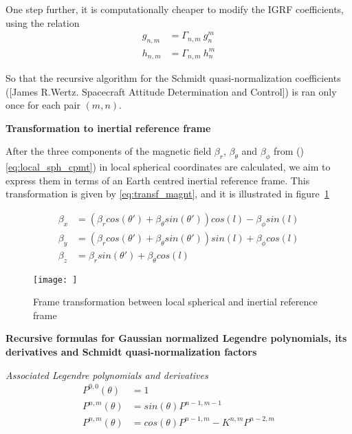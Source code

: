 One step further, it is computationally cheaper to modify the IGRF coefficients, using the relation
\begin{equation}
\begin{aligned}
g_{n,m} &= \Gamma_{n,m}\ g_n^m \\ h_{n,m} &= \Gamma_{n,m}\  h_n^m
\end{aligned}
\end{equation}

So that the recursive algorithm for the Schmidt quasi-normalization coefficients ([James R.Wertz. Spacecraft Attitude Determination and Control]) is ran only once for each pair $(m,n)$.

\textbf{Transformation to inertial reference frame}

After the three components of the magnetic field $\beta_r$, $\beta_{\theta}$ and $\beta_{\phi}$ from ()\ref{eq:local_sph_cpmt}) in local spherical coordinates are calculated, we aim to express them in terms of an Earth centred inertial reference frame. This transformation is given by \ref{eq:transf_magnt}, and it is illustrated in figure~\ref{fig:transf_magnt}

\begin{equation}
\begin{aligned} \label{eq:transf_magnt}
\beta_x &= \left(\beta_r cos(\theta') +  \beta_{\theta}sin(\theta')\right)cos(l) - \beta_{\phi}sin(l)\\
\beta_y &= \left(\beta_r cos(\theta') +  \beta_{\theta}sin(\theta')\right)sin(l) + \beta_{\phi}cos(l)\\
\beta_z &= \beta_r sin(\theta') + \beta_{\theta} cos(l)
\end{aligned}
\end{equation}

\begin{figure} \label{fig:transf_magnt}
	\centering
	\texttt{[image: ]}
	\caption{Frame transformation between local spherical and inertial reference frame}
\end{figure}

{\bf Recursive formulas for Gaussian normalized Legendre polynomials, its derivatives and Schmidt quasi-normalization factors}

{\it Associated Legendre polynomials and derivatives}
\begin{equation} \label{eq:Legendre_Recursive}
\begin{aligned}
P^{0,0}(\theta) &= 1\\
P^{n,m}(\theta) &= sin(\theta)P^{n-1,m-1}\\
P^{n,m}(\theta) &= cos(\theta)P^{n-1,m} - K^{n,m}P^{n-2,m}
\end{aligned}
\end{equation}

